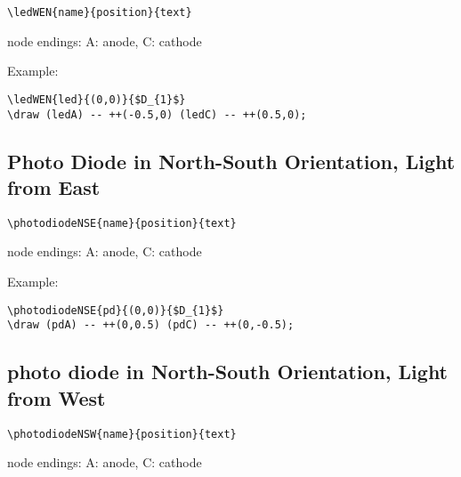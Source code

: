 \documentclass[parskip=full]{scrartcl}
\begin{document}
\begin{verbatim}
\ledWEN{name}{position}{text}
\end{verbatim}
node endings: A: anode, C: cathode

Example:\\
\begin{minipage}{0.8\textwidth}
\begin{verbatim}
\ledWEN{led}{(0,0)}{$D_{1}$}
\draw (ledA) -- ++(-0.5,0) (ledC) -- ++(0.5,0);
\end{verbatim}
\end{minipage}
\begin{minipage}{0.19\textwidth}
\end{minipage}

\subsection{Photo Diode in North-South Orientation, Light from East}

\begin{verbatim}
\photodiodeNSE{name}{position}{text}
\end{verbatim}
node endings: A: anode, C: cathode

Example:\\
\begin{minipage}{0.8\textwidth}
\begin{verbatim}
\photodiodeNSE{pd}{(0,0)}{$D_{1}$}
\draw (pdA) -- ++(0,0.5) (pdC) -- ++(0,-0.5);
\end{verbatim}
\end{minipage}
\begin{minipage}{0.19\textwidth}
\end{minipage}

\subsection{photo diode in North-South Orientation, Light from West}

\begin{verbatim}
\photodiodeNSW{name}{position}{text}
\end{verbatim}
node endings: A: anode, C: cathode
\end{document}
